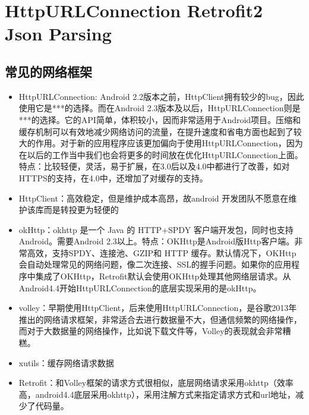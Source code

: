 \documentclass[9pt, b5paper]{article}
\begin{document}
\section{HttpURLConnection Retrofit2 Json Parsing}
\label{sec-3}
\subsection{常见的网络框架}
\label{sec-3-1}
\begin{itemize}
\item HttpURLConnection:  Android 2.2版本之前，HttpClient拥有较少的bug，因此使用它是***的选择。而在Android 2.3版本及以后，HttpURLConnection则是***的选择。它的API简单，体积较小，因而非常适用于Android项目。压缩和缓存机制可以有效地减少网络访问的流量，在提升速度和省电方面也起到了较大的作用。对于新的应用程序应该更加偏向于使用HttpURLConnection，因为在以后的工作当中我们也会将更多的时间放在优化HttpURLConnection上面。特点：比较轻便，灵活，易于扩展，在3.0后以及4.0中都进行了改善，如对HTTPS的支持，在4.0中，还增加了对缓存的支持。
\item HttpClient：高效稳定，但是维护成本高昂，故android 开发团队不愿意在维护该库而是转投更为轻便的
\item okHttp：okhttp 是一个 Java 的 HTTP+SPDY 客户端开发包，同时也支持 Android。需要Android 2.3以上。特点：OKHttp是Android版Http客户端。非常高效，支持SPDY、连接池、GZIP和 HTTP 缓存。默认情况下，OKHttp会自动处理常见的网络问题，像二次连接、SSL的握手问题。如果你的应用程序中集成了OKHttp，Retrofit默认会使用OKHttp处理其他网络层请求。从Android4.4开始HttpURLConnection的底层实现采用的是okHttp。
\item volley：早期使用HttpClient，后来使用HttpURLConnection，是谷歌2013年推出的网络请求框架，非常适合去进行数据量不大，但通信频繁的网络操作，而对于大数据量的网络操作，比如说下载文件等，Volley的表现就会非常糟糕。
\item xutils：缓存网络请求数据
\item Retrofit：和Volley框架的请求方式很相似，底层网络请求采用okhttp（效率高，android4.4底层采用okhttp），采用注解方式来指定请求方式和url地址，减少了代码量。
\end{itemize}
\end{document}
